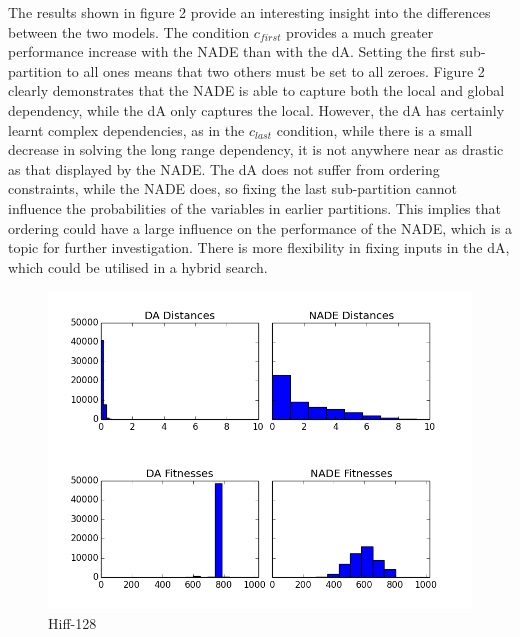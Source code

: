 \documentclass[twoside]{article}
\begin{document}
The results shown in figure 2 provide an interesting insight into the differences between the two models. The condition \(c_{first}\) provides a much greater performance increase with the NADE than with the dA. Setting the first sub-partition to all ones means that two others must be set to all zeroes. Figure 2 clearly demonstrates that the NADE is able to capture both the local and global dependency, while the dA only captures the local. However, the dA has certainly learnt complex dependencies, as in the \(c_{last}\) condition, while there is a small decrease in solving the long range dependency, it is not anywhere near as drastic as that displayed by the NADE. The dA does not suffer from ordering constraints, while the NADE does, so fixing the last sub-partition cannot influence the probabilities of the variables in earlier partitions. This implies that ordering could have a large influence on the performance of the NADE, which is a topic for further investigation. There is more flexibility in fixing inputs in the dA, which could be utilised in a hybrid search.

\begin{figure}[t!]
\centering
    \includegraphics[scale=0.8]{hiff_hist.png}
  \caption{Hiff-128}
\end{figure}


\small



\end{document}
